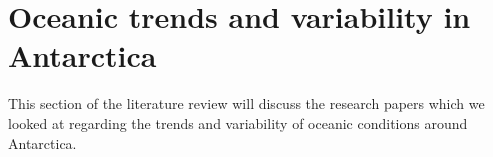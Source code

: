 \section{Oceanic trends and variability in Antarctica}
This section of the literature review will discuss the research papers which we looked at regarding the trends and variability of oceanic conditions around Antarctica.